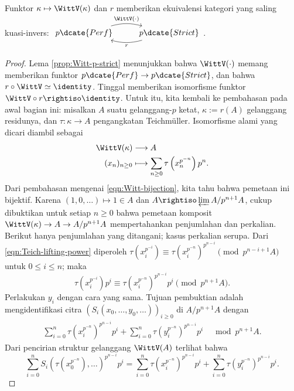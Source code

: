 \begin{theorem}\label{prop:Witt-vs-strict}
	Funktor $\kappa \mapsto \WittV(\kappa)$ dan $r$ memberikan ekuivalensi kategori yang saling kuasi-invers:
	$\begin{tikzcd}
		p\dcate{Perf} \arrow[bend left=15, r, "{\WittV(\cdot)}"] & p\dcate{Strict} \arrow[l, bend left=15, "r"]
	\end{tikzcd}$.
\end{theorem}
\begin{proof}
	Lema \ref{prop:Witt-p-strict} menunjukkan bahwa $\WittV(\cdot)$ memang memberikan funktor $p\dcate{Perf} \to p\dcate{Strict}$, dan bahwa $r \circ \WittV \simeq \identity$. Tinggal memberikan isomorfisme funktor $\WittV \circ r \rightiso \identity$. Untuk itu, kita kembali ke pembahasan pada awal bagian ini: misalkan $A$ suatu gelanggang-$p$ ketat, $\kappa := r(A)$ gelanggang residunya, dan $\tau: \kappa \to A$ pengangkatan Teichmüller. Isomorfisme alami yang dicari diambil sebagai
	\begin{align*}
		\WittV(\kappa) & \longrightarrow A \\
		(x_n)_{n \geq 0} & \longmapsto \sum_{n \geq 0} \tau\left( x_n^{p^{-n}} \right) p^n.
	\end{align*}
	Dari pembahasan mengenai \eqref{eqn:Witt-bijection}, kita tahu bahwa pemetaan ini bijektif. Karena $(1, 0, \ldots) \mapsto 1 \in A$ dan $A \rightiso \varprojlim A/p^{n+1}A$, cukup dibuktikan untuk setiap $n \geq 0$ bahwa pemetaan komposit $\WittV(\kappa) \to A \to A/p^{n+1} A$ mempertahankan penjumlahan dan perkalian. Berikut hanya penjumlahan yang ditangani; kasus perkalian serupa. Dari \eqref{eqn:Teich-lifting-power} diperoleh $\tau(x_i^{p^{-i}}) \equiv \tau(x_i^{p^{-n}})^{p^{n-i}} \pmod{p^{n-i+1}A}$ untuk $0 \leq i \leq n$; maka
	\[ \tau\left( x_i^{p^{-i}} \right) p^i \equiv  \tau\left( x_i^{p^{-n}} \right)^{p^{n-i}} p^i  \pmod{p^{n+1} A}. \]
	Perlakukan $y_i$ dengan cara yang sama. Tujuan pembuktian adalah mengidentifikasi citra $(S_i(x_0, \ldots, y_0, \ldots))_{i \geq 0}$ di $A/p^{n+1} A$ dengan
	\begin{gather}\label{eqn:strict-p-ring-sum}
		\sum_{i=0}^n \tau\left( x_i^{p^{-n}} \right)^{p^{n-i}} p^i + \sum_{i=0}^n \tau\left( y_i^{p^{-n}} \right)^{p^{n-i}} p^i \quad \bmod p^{n+1}A.
	\end{gather}
	Dari pencirian struktur gelanggang $\WittV(A)$ terlihat bahwa
	\[ \sum_{i=0}^n S_i\left( \tau(x_0^{p^{-n}}), \ldots \right)^{p^{n-i}} p^i = \sum_{i=0}^n \tau\left( x_i^{p^{-n}} \right)^{p^{n-i}} p^i + \sum_{i=0}^n \tau\left( y_i^{p^{-n}} \right)^{p^{n-i}} p^i. \]

\end{proof}
